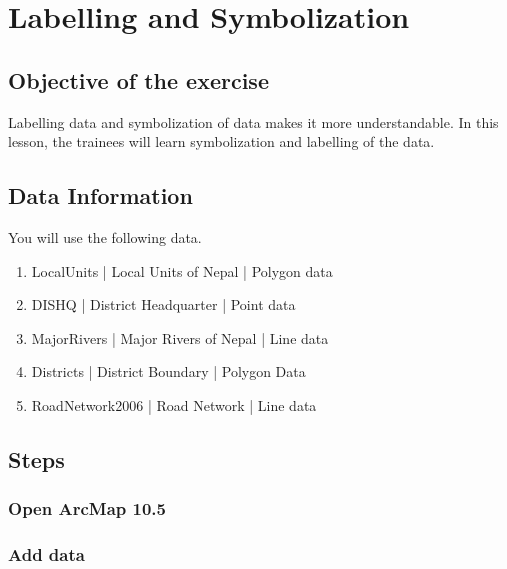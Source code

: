 \chapter{Labelling and Symbolization}

\section{Objective of the exercise}
Labelling data and symbolization of data makes it more understandable. In this lesson, the trainees will learn symbolization and labelling of the data.

\section{Data Information}
You will use the following data.
\begin{enumerate}
\item{LocalUnits | Local Units of Nepal | Polygon data}
\item{DIS\textunderscore HQ | District Headquarter | Point data}
\item{MajorRivers | Major Rivers of Nepal | Line data}
\item{Districts | District Boundary | Polygon Data}
\item{RoadNetwork2006 | Road Network | Line data}
\end{enumerate}

\section{Steps}
\subsection{Open ArcMap 10.5}
\subsection{Add data}

